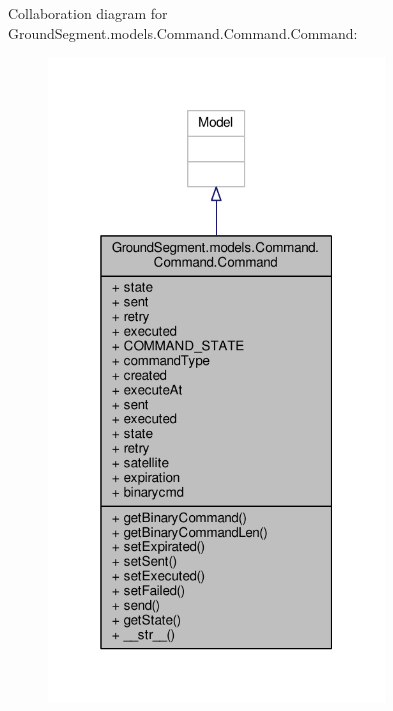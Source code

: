 Collaboration diagram for Ground\+Segment.\+models.\+Command.\+Command.\+Command\+:\nopagebreak
\begin{figure}[H]
\begin{center}
\leavevmode
\includegraphics[width=253pt]{class_ground_segment_1_1models_1_1_command_1_1_command_1_1_command__coll__graph}
\end{center}
\end{figure}
